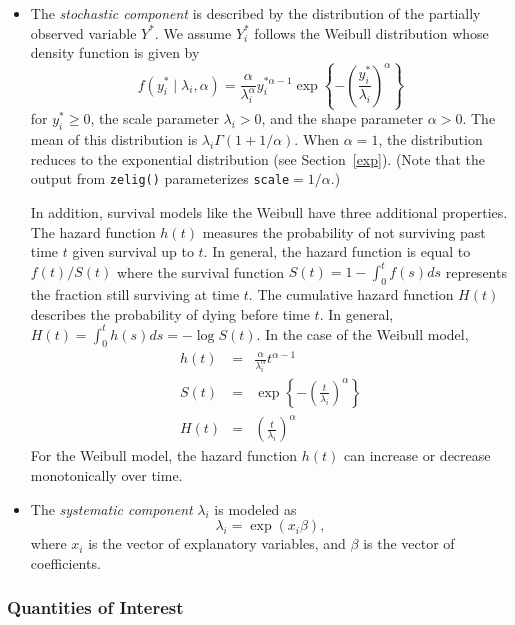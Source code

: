 \begin{itemize}
\item The \emph{stochastic component} is described by the distribution
  of the partially observed variable $Y^*$.  We assume $Y_i^*$ follows
  the Weibull distribution whose density function is given by
  \begin{equation*}
    f(y_i^*\mid \lambda_i, \alpha) = \frac{\alpha}{\lambda_i^\alpha}
    y_i^{* \alpha-1} \exp \left\{ -\left( \frac{y_i^*}{\lambda_i}
\right)^{\alpha} \right\}
  \end{equation*}
  for $y_i^* \ge 0$, the scale parameter $\lambda_i > 0$, and the shape
  parameter $\alpha > 0$. The mean of this distribution is $\lambda_i
  \Gamma(1 + 1 / \alpha)$. When $\alpha = 1$, the distribution reduces to
  the exponential distribution (see Section~\ref{exp}).  (Note that
the output from {\tt zelig()} parameterizes {\tt scale}$ = 1 / \alpha$.)

In addition, survival models like the Weibull have three additional
properties.  The hazard function $h(t)$ measures the probability of
not surviving past time $t$ given survival up to $t$. In general,
the hazard function is equal to $f(t)/S(t)$ where the survival
function $S(t) = 1 - \int_{0}^t f(s) ds$ represents the fraction still
surviving at time $t$.  The cumulative hazard function $H(t)$
describes the probability of dying before time $t$.  In general,
$H(t)= \int_{0}^{t} h(s) ds = -\log S(t)$.  In the case of the Weibull
model,
\begin{eqnarray*}
h(t) &=& \frac{\alpha}{\lambda_i^{\alpha}} t^{\alpha - 1}  \\
S(t) &=&  \exp \left\{ -\left( \frac{t}{\lambda_i} \right)^{\alpha} \right\} \\
H(t) &=& \left( \frac{t}{\lambda_i} \right)^{\alpha}
\end{eqnarray*}
For the Weibull model, the hazard function $h(t)$ can increase or
decrease monotonically over time.  

\item The \emph{systematic component} $\lambda_i$ is modeled as
  \begin{equation*}
    \lambda_i = \exp(x_i \beta),
  \end{equation*}
  where $x_i$ is the vector of explanatory variables, and $\beta$ is
  the vector of coefficients.
  
\end{itemize}

\subsubsection{Quantities of Interest}

